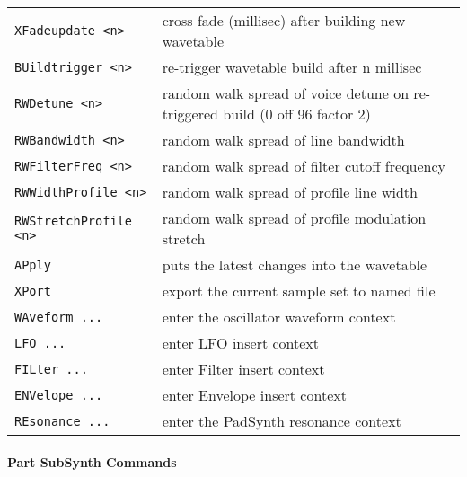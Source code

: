   \begin{table}
      \begin{tabular}{l l}
\texttt{XFadeupdate <n>} &
   cross fade (millisec) after building new wavetable \\
\texttt{BUildtrigger <n>} &
   re-trigger wavetable build after n millisec \\
\texttt{RWDetune <n>} &
   random walk spread of voice detune on re-triggered build (0 off 96 factor 2) \\
\texttt{RWBandwidth <n>} &
   random walk spread of line bandwidth \\
\texttt{RWFilterFreq <n>} &
   random walk spread of filter cutoff frequency \\
\texttt{RWWidthProfile <n>} &
   random walk spread of profile line width \\
\texttt{RWStretchProfile <n>} &
   random walk spread of profile modulation stretch \\
\texttt{APply} &
   puts the latest changes into the wavetable \\
\texttt{XPort} &
   export the current sample set to named file \\
\texttt{WAveform ...} &
   enter the oscillator waveform context \\
\texttt{LFO ...} &
   enter LFO insert context  \\
\texttt{FILter ...} &
   enter Filter insert context  \\
\texttt{ENVelope ...} &
   enter Envelope insert context   \\
\texttt{REsonance ...} &
   enter the PadSynth resonance context \\
      \end{tabular}
   \end{table}


\paragraph{Part SubSynth Commands}
\label{paragraph:command_line_part_subsynth_commands}

